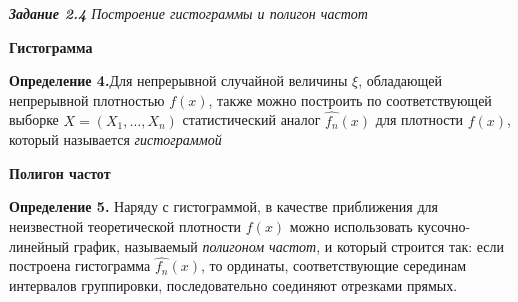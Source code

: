 \documentclass[a4paper,12pt, oneside]{book}
\begin{document}
\newpage
{\large\textit{\textbf{Задание 2.4} Построение гистограммы и полигон частот}}

\vspace{5mm}
\large{\textbf{Гистограмма}}
\vspace{5mm}

\normalsize{\textbf{Определение 4.}}Для непрерывной случайной величины $\xi$, обладающей непрерывной плотностью $f(x)$, также можно построить по соответствующей выборке $X = (X_1, \ldots, X_n)$ статистический аналог $\hat{f_n} (x)$ для плотности $f(x)$, который называется \textit{гистограммой}  

\vspace{5mm}
\large{\textbf{Полигон частот}}
\vspace{5mm}

\normalsize{\textbf{Определение 5.}} Наряду с гистограммой, в качестве приближения для неизвестной теоретической плотности $ f(x)$ можно использовать кусочно-линейный график, называемый \textit{полигоном частот}, и который строится так: если построена гистограмма $\hat{f_n} (x)$, то ординаты, соответствующие серединам интервалов группировки, последовательно соединяют отрезками прямых. 
\end{document}
